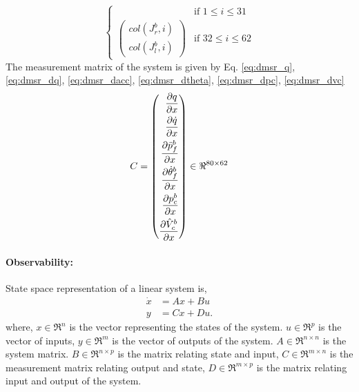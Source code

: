 \begin{enumerate}
\[\begin{cases}
	& \text{if } 1 \leq i \leq 31 \\
	\begin{pmatrix}
	col(J_{r}^{b},i)\\ col(J_{l}^{b},i)
	\end{pmatrix}
	 	& \text{if } 32 \leq i \leq 62
	\end{cases}
\]
The measurement matrix of the system is given by Eq. \ref{eq:dmsr_q}, \ref{eq:dmsr_dq}, \ref{eq:dmsr_dacc}, \ref{eq:dmsr_dtheta}, \ref{eq:dmsr_dpc}, \ref{eq:dmsr_dvc}
\begin{equation}
C = \left(
   \begin{aligned}
   \frac{\partial {q}}{\partial {x}} \\
	 \frac{\partial {\dot{q}}}{\partial {x}}\\
	 \frac{\partial {\ddot{p}_{f}^{b}}}{\partial {x}}\\
	 \frac{\partial {\dot{\theta}_{f}^{b}}}{\partial {x}}\\
	 \frac{\partial {p_{c}^{b}}}{\partial {x}}\\
	 \frac{\partial {\hat{V}_{c}^{b}}}{\partial {x}} 
   \end{aligned}
	 \right) \in \Re^{80 \times 62}
\end{equation}

\end{enumerate}
\paragraph{Observability:}
State space representation of a linear system is,
\begin{equation}
\label{eq:dyn_l}
\begin{split}
\dot{x} &= Ax + Bu\\
y &= Cx + Du.
\end{split}
\end{equation}
where, $x \in \Re^{n}$ is the vector representing the states of the system. $u \in \Re^{p}$ is the vector of inputs, $y \in \Re^{m}$ is the vector of outputs of the system. $A \in \Re^{n \times n}$ is the system matrix. $B \in \Re^{n \times p}$ is the matrix relating state and input, $C \in \Re^{m \times n}$ is the measurement matrix relating output and state, $D \in \Re^{m \times p}$ is the matrix relating input and output of the system.

